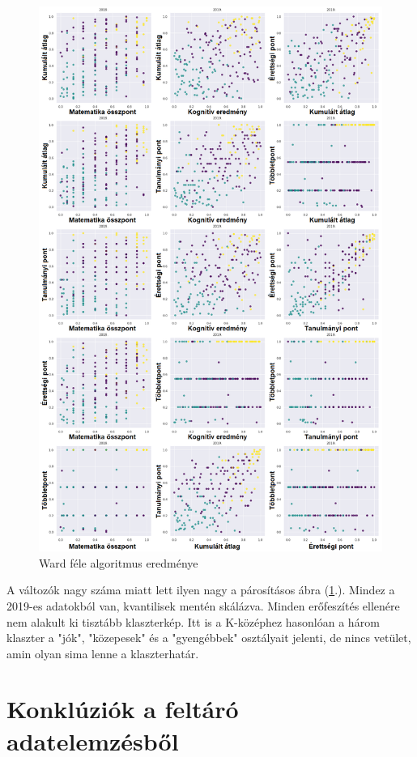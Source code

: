 \documentclass[12pt]{article}
\begin{document}
\begin{figure}[H]
\centering
\includegraphics[scale = 0.57]{kepek/klacterward.png}
\caption{Ward féle algoritmus eredménye}
\label{fig:klacterward}
\end{figure}

A változók nagy száma miatt lett ilyen nagy a párosításos ábra (\ref{fig:klacterward}.). Mindez a 2019-es adatokból van, kvantilisek mentén skálázva. Minden erőfeszítés ellenére nem alakult ki tisztább klaszterkép. Itt is a K-középhez hasonlóan a három klaszter a "jók", "közepesek" és a "gyengébbek" osztályait jelenti, de nincs vetület, amin olyan sima lenne a klaszterhatár.

\section{Konklúziók a feltáró adatelemzésből}
\end{document}
